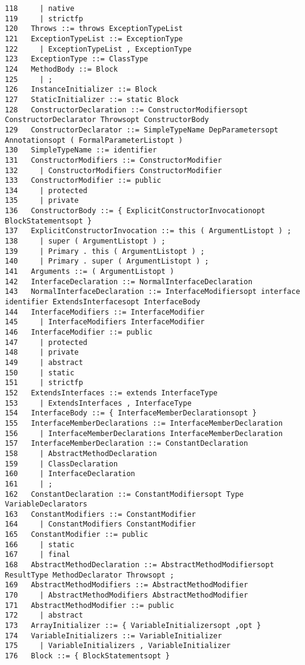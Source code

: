 {\begin{verbatim}
118     | native
119     | strictfp
120   Throws ::= throws ExceptionTypeList
121   ExceptionTypeList ::= ExceptionType
122     | ExceptionTypeList , ExceptionType
123   ExceptionType ::= ClassType
124   MethodBody ::= Block
125     | ;
126   InstanceInitializer ::= Block
127   StaticInitializer ::= static Block
128   ConstructorDeclaration ::= ConstructorModifiersopt ConstructorDeclarator Throwsopt ConstructorBody
129   ConstructorDeclarator ::= SimpleTypeName DepParametersopt Annotationsopt ( FormalParameterListopt )
130   SimpleTypeName ::= identifier
131   ConstructorModifiers ::= ConstructorModifier
132     | ConstructorModifiers ConstructorModifier
133   ConstructorModifier ::= public
134     | protected
135     | private
136   ConstructorBody ::= { ExplicitConstructorInvocationopt BlockStatementsopt }
137   ExplicitConstructorInvocation ::= this ( ArgumentListopt ) ;
138     | super ( ArgumentListopt ) ;
139     | Primary . this ( ArgumentListopt ) ;
140     | Primary . super ( ArgumentListopt ) ;
141   Arguments ::= ( ArgumentListopt )
142   InterfaceDeclaration ::= NormalInterfaceDeclaration
143   NormalInterfaceDeclaration ::= InterfaceModifiersopt interface identifier ExtendsInterfacesopt InterfaceBody
144   InterfaceModifiers ::= InterfaceModifier
145     | InterfaceModifiers InterfaceModifier
146   InterfaceModifier ::= public
147     | protected
148     | private
149     | abstract
150     | static
151     | strictfp
152   ExtendsInterfaces ::= extends InterfaceType
153     | ExtendsInterfaces , InterfaceType
154   InterfaceBody ::= { InterfaceMemberDeclarationsopt }
155   InterfaceMemberDeclarations ::= InterfaceMemberDeclaration
156     | InterfaceMemberDeclarations InterfaceMemberDeclaration
157   InterfaceMemberDeclaration ::= ConstantDeclaration
158     | AbstractMethodDeclaration
159     | ClassDeclaration
160     | InterfaceDeclaration
161     | ;
162   ConstantDeclaration ::= ConstantModifiersopt Type VariableDeclarators
163   ConstantModifiers ::= ConstantModifier
164     | ConstantModifiers ConstantModifier
165   ConstantModifier ::= public
166     | static
167     | final
168   AbstractMethodDeclaration ::= AbstractMethodModifiersopt ResultType MethodDeclarator Throwsopt ;
169   AbstractMethodModifiers ::= AbstractMethodModifier
170     | AbstractMethodModifiers AbstractMethodModifier
171   AbstractMethodModifier ::= public
172     | abstract
173   ArrayInitializer ::= { VariableInitializersopt ,opt }
174   VariableInitializers ::= VariableInitializer
175     | VariableInitializers , VariableInitializer
176   Block ::= { BlockStatementsopt }

\end{verbatim}}
